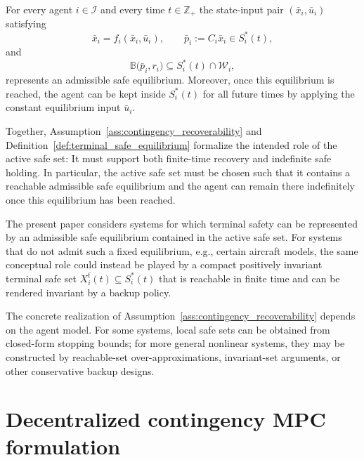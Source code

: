 \documentclass[twocolumn]{autart}
\begin{document}
\begin{definition}
\label{def:terminal_safe_equilibrium}
For every agent $i\in\mathcal{I}$ and every time $t\in\mathbb{Z}_+$ the state-input pair $(\bar x_i,\bar u_i)$ satisfying
\[
\bar x_i = f_i(\bar x_i,\bar u_i),
\qquad
\bar p_i := C_i\bar x_i \in S_i^\ast(t),
\]
and
\[
\mathbb{B}\big(\bar p_i,r_i\big)\subseteq S_i^\ast(t)\cap\mathcal{W}_i,
\]
represents an admissible safe equilibrium.
Moreover, once this equilibrium is reached, the agent can be kept inside $S_i^\ast(t)$ for all future times by applying the constant equilibrium input $\bar u_i$.
\end{definition}

Together, Assumption~\ref{ass:contingency_recoverability} and Definition~\ref{def:terminal_safe_equilibrium} formalize the intended role of the active safe set: It must support both finite-time recovery and indefinite safe holding. In particular, the active safe set must be chosen such that it contains a reachable admissible safe equilibrium and the agent can remain there indefinitely once this equilibrium has been reached.

\begin{remark}
\label{rem:terminal_invariant_set_extension}
The present paper considers systems for which terminal safety can be represented by an admissible safe equilibrium contained in the active safe set. For systems that do not admit such a fixed equilibrium, e.g., certain aircraft models, the same conceptual role could instead be played by a compact positively invariant terminal safe set $X_i^{\mathrm f}(t)\subseteq S_i^\ast(t)$ that is reachable in finite time and can be rendered invariant by a backup policy. %
\end{remark}

\begin{remark}
\label{rem:model_dependent_realization}
The concrete realization of Assumption~\ref{ass:contingency_recoverability} depends on the agent model. For some systems, local safe sets can be obtained from closed-form stopping bounds; for more general nonlinear systems, they may be constructed by reachable-set over-approximations, invariant-set arguments, or other conservative backup designs.
\end{remark}
\section{Decentralized contingency MPC formulation}
\label{sec:dcmpc}
\end{document}
